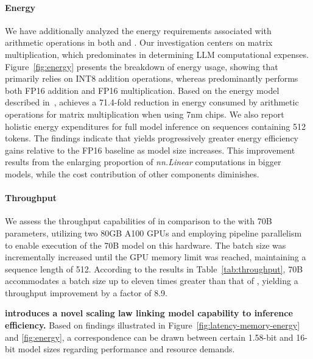 \paragraph{Energy}

We have additionally analyzed the energy requirements associated with arithmetic operations in both  and . Our investigation centers on matrix multiplication, which predominates in determining LLM computational expenses. Figure~\ref{fig:energy} presents the breakdown of energy usage, showing that  primarily relies on INT8 addition operations, whereas  predominantly performs both FP16 addition and FP16 multiplication. Based on the energy model described in~\cite{energycost, pokebnn},  achieves a 71.4-fold reduction in energy consumed by arithmetic operations for matrix multiplication when using 7nm chips. We also report holistic energy expenditures for full model inference on sequences containing 512 tokens. The findings indicate that  yields progressively greater energy efficiency gains relative to the FP16  baseline as model size increases. This improvement results from the enlarging proportion of \emph{nn.Linear} computations in bigger models, while the cost contribution of other components diminishes.

\paragraph{Throughput}

We assess the throughput capabilities of  in comparison to the  with 70B parameters, utilizing two 80GB A100 GPUs and employing pipeline parallelism~\cite{gpipe} to enable execution of the  70B model on this hardware. The batch size was incrementally increased until the GPU memory limit was reached, maintaining a sequence length of 512. According to the results in Table~\ref{tab:throughput},  70B accommodates a batch size up to eleven times greater than that of , yielding a throughput improvement by a factor of 8.9.

\textbf{ introduces a novel scaling law linking model capability to inference efficiency.} Based on findings illustrated in Figure~\ref{fig:latency-memory-energy} and \ref{fig:energy}, a correspondence can be drawn between certain 1.58-bit and 16-bit model sizes regarding performance and resource demands.

